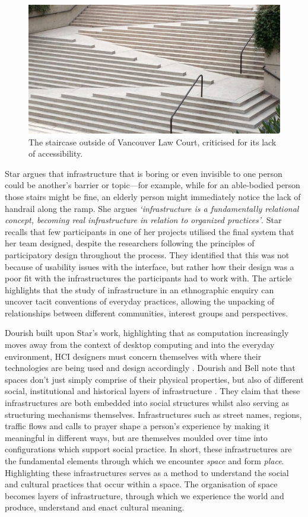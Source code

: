 \begin{figure}
  \centering
  \includegraphics[width=0.8\columnwidth]{images/chapter02/stairs.jpg}
  \caption[Vancouver Law Court staircase]{The staircase outside of Vancouver Law Court, criticised for its lack of accessibility.}
  \label{fig:stairs}
\end{figure}

Star argues that infrastructure that is boring or even invisible to one person could be another's barrier or topic---for example, while for an able-bodied person those stairs might be fine, an elderly person might immediately notice the lack of handrail along the ramp. She argues \textit{`infrastructure is a fundamentally relational concept, becoming real infrastructure in relation to organized practices'}. Star recalls that few participants in one of her projects utilised the final system that her team designed, despite the researchers following the principles of participatory design throughout the process. They identified that this was not because of usability issues with the interface, but rather how their design was a poor fit with the infrastructures the participants had to work with. The article highlights that the study of infrastructure in an ethnographic enquiry can uncover tacit conventions of everyday practices, allowing the unpacking of relationships between different communities, interest groups and perspectives.

Dourish built upon Star's work, highlighting that as computation increasingly moves away from the context of desktop computing and into the everyday environment, HCI designers must concern themselves with where their technologies are being used and design accordingly \citep{Dourish2006}. Dourish and Bell note that spaces don't just simply comprise of their physical properties, but also of different social, institutional and historical layers of infrastructure \citep{Dourish2007}. They claim that these infrastructures are both embedded into social structures whilst also serving as structuring mechanisms themselves. Infrastructures such as street names, regions, traffic flows and calls to prayer shape a person's experience by making it meaningful in different ways, but are themselves moulded over time into configurations which support social practice. In short, these infrastructures are the fundamental elements through which we encounter \textit{space} and form \textit{place}. Highlighting these infrastructures serves as a method to understand the social and cultural practices that occur within a space. The organisation of space becomes layers of infrastructure, through which we experience the world and produce, understand and enact cultural meaning. 

